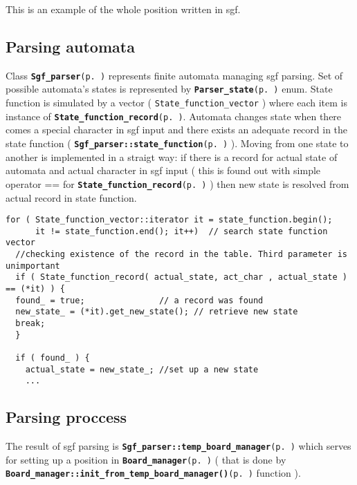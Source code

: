 This is an example of the whole position written in sgf.\subsection{Parsing automata}\label{page_5_page_5__sec_2}
Class {\tt {\bf Sgf\_\-parser}{\rm (p.\,\pageref{classSgf__parser})}} represents finite automata managing sgf parsing. Set of possible automata's states is represented by {\tt {\bf Parser\_\-state}{\rm (p.\,\pageref{sgf__read_8h_a7})}} enum. State function is simulated by a vector ( {\tt State\_\-function\_\-vector} ) where each item is instance of {\tt {\bf State\_\-function\_\-record}{\rm (p.\,\pageref{classState__function__record})}}. Automata changes state when there comes a special character in sgf input and there exists an adequate record in the state function ( {\tt {\bf Sgf\_\-parser::state\_\-function}{\rm (p.\,\pageref{classSgf__parser_r1})}} ). Moving from one state to another is implemented in a straigt way: if there is a record for actual state of automata and actual character in sgf input ( this is found out with simple operator == for {\tt {\bf State\_\-function\_\-record}{\rm (p.\,\pageref{classState__function__record})}} ) then new state is resolved from actual record in state function.

\label{page_5_page_5__resolving_new_state}
 

\footnotesize\begin{verbatim}for ( State_function_vector::iterator it = state_function.begin(); 
      it != state_function.end(); it++)  // search state function vector
  //checking existence of the record in the table. Third parameter is unimportant 
  if ( State_function_record( actual_state, act_char , actual_state ) == (*it) ) { 
  found_ = true;               // a record was found 
  new_state_ = (*it).get_new_state(); // retrieve new state 
  break; 
  }

  if ( found_ ) {
    actual_state = new_state_; //set up a new state
    ...
\end{verbatim}
\normalsize
\subsection{Parsing proccess}\label{page_5_page_5__sec_3}
The result of sgf parsing is {\tt {\bf Sgf\_\-parser::temp\_\-board\_\-manager}{\rm (p.\,\pageref{classSgf__parser_r12})}} which serves for setting up a position in {\tt {\bf Board\_\-manager}{\rm (p.\,\pageref{classBoard__manager})}} ( that is done by {\tt {\bf Board\_\-manager::init\_\-from\_\-temp\_\-board\_\-manager()}{\rm (p.\,\pageref{classBoard__manager_a14})}} function ).

